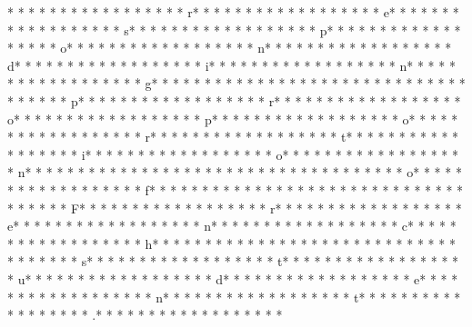 * *  * * *  * * *  *  * * *  *  * * *  * r* * *  * * *  * * *  *  * * *  *  * * *  * e* * *  * * *  * * *  *  * * *  *  * * *  * s* * *  * * *  * * *  *  * * *  *  * * *  * p* * *  * * *  * * *  *  * * *  *  * * *  * o* * *  * * *  * * *  *  * * *  *  * * *  * n* * *  * * *  * * *  *  * * *  *  * * *  * d* * *  * * *  * * *  *  * * *  *  * * *  * i* * *  * * *  * * *  *  * * *  *  * * *  * n* * *  * * *  * * *  *  * * *  *  * * *  * g* * *  * * *  * * *  *  * * *  *  * * *  *  * * *  * * *  * * *  *  * * *  *  * * *  * p* * *  * * *  * * *  *  * * *  *  * * *  * r* * *  * * *  * * *  *  * * *  *  * * *  * o* * *  * * *  * * *  *  * * *  *  * * *  * p* * *  * * *  * * *  *  * * *  *  * * *  * o* * *  * * *  * * *  *  * * *  *  * * *  * r* * *  * * *  * * *  *  * * *  *  * * *  * t* * *  * * *  * * *  *  * * *  *  * * *  * i* * *  * * *  * * *  *  * * *  *  * * *  * o* * *  * * *  * * *  *  * * *  *  * * *  * n* * *  * * *  * * *  *  * * *  *  * * *  *  * * *  * * *  * * *  *  * * *  *  * * *  * o* * *  * * *  * * *  *  * * *  *  * * *  * f* * *  * * *  * * *  *  * * *  *  * * *  *  * * *  * * *  * * *  *  * * *  *  * * *  * F* * *  * * *  * * *  *  * * *  *  * * *  * r* * *  * * *  * * *  *  * * *  *  * * *  * e* * *  * * *  * * *  *  * * *  *  * * *  * n* * *  * * *  * * *  *  * * *  *  * * *  * c* * *  * * *  * * *  *  * * *  *  * * *  * h* * *  * * *  * * *  *  * * *  *  * * *  *  * * *  * * *  * * *  *  * * *  *  * * *  * s* * *  * * *  * * *  *  * * *  *  * * *  * t* * *  * * *  * * *  *  * * *  *  * * *  * u* * *  * * *  * * *  *  * * *  *  * * *  * d* * *  * * *  * * *  *  * * *  *  * * *  * e* * *  * * *  * * *  *  * * *  *  * * *  * n* * *  * * *  * * *  *  * * *  *  * * *  * t* * *  * * *  * * *  *  * * *  *  * * *  * .* * *  * * *  * * *  *  * * *  *  * * *  * 

